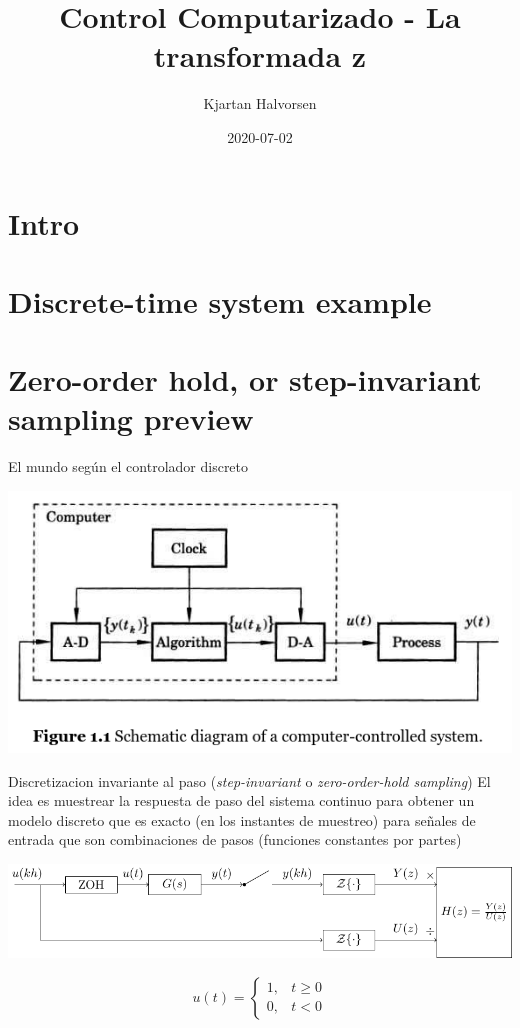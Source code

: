 \documentclass[presentation,aspectratio=169]{beamer}
\author{Kjartan Halvorsen}
\date{2020-07-02}
\title{Control Computarizado - La transformada z}
\begin{document}
\maketitle

\section{Intro}
\label{sec:orge149df4}
\section{Discrete-time system example}
\label{sec:org89d92a9}

\section{Zero-order hold, or step-invariant sampling preview}
\label{sec:orgceca1c8}

\begin{frame}[label={sec:org7e39616}]{El mundo según el controlador discreto}
\begin{center}
\includegraphics[width=0.6\linewidth]{../../figures/fig1-1-schematic.png}
\end{center}
\end{frame}

\begin{frame}[label={sec:org59e53f9}]{Discretizacion invariante al paso (\emph{step-invariant} o \emph{zero-order-hold sampling})}
El idea es muestrear la respuesta de paso del sistema continuo para obtener un modelo discreto que es \alert{exacto} (en los instantes de muestreo) para señales de entrada que son combinaciones de pasos (funciones constantes por partes)

\begin{center}
\includegraphics[width=0.9\linewidth]{../../figures/invariant-sampling.pdf}
\end{center}

\[ u(t) = \begin{cases} 1, & t \ge 0\\0, & t<0 \end{cases} \]
\end{frame}
\end{document}
